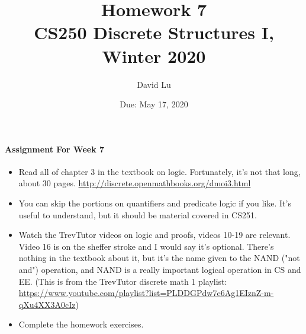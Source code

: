 \documentclass[11pt]{article} %
\title{\bf Homework 7\\[1ex]
\rm\normalsize CS250 Discrete Structures I, Winter 2020 }
\date{\normalsize Due: May 17, 2020}
\author{\normalsize David Lu}
\begin{document}

	\vspace{-4cm}\maketitle %
	
	\begin{center}
	\end{center}
	
	\paragraph{Assignment For Week 7}
	
	\begin{itemize}
		\item Read all of chapter 3 in the textbook on logic. Fortunately, it's not that long, about 30 pages. \href{http://discrete.openmathbooks.org/dmoi3.html}{http://discrete.openmathbooks.org/dmoi3.html}
		\item You can skip the portions on quantifiers and predicate logic if you like. It's useful to understand, but it should be material covered in CS251. 
		\item Watch the TrevTutor videos on logic and proofs, videos 10-19 are relevant. Video 16 is on the sheffer stroke and I would say it's optional. There's nothing in the textbook about it, but it's the name given to the NAND ("not and") operation, and NAND is a really important logical operation in CS and EE. (This is from the TrevTutor discrete math 1 playlist: \url{https://www.youtube.com/playlist?list=PLDDGPdw7e6Ag1EIznZ-m-qXu4XX3A0cIz})
		\item Complete the homework exercises.
	\end{itemize}
\end{document}
